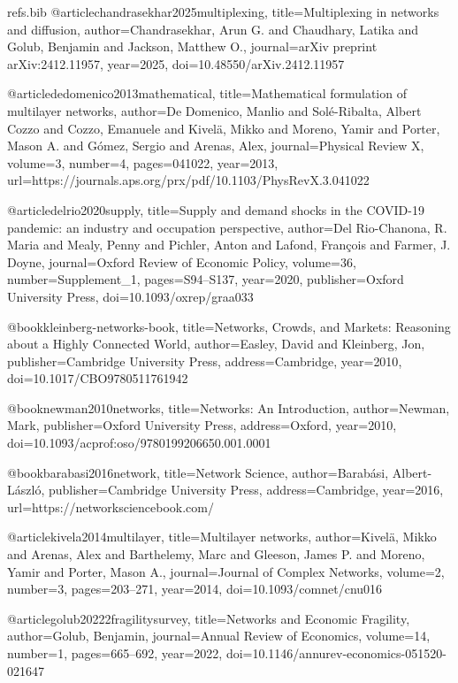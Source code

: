 \begin{filecontents}[overwrite]{refs.bib}
@article{chandrasekhar2025multiplexing,
  title={Multiplexing in networks and diffusion},
  author={Chandrasekhar, Arun G. and Chaudhary, Latika and Golub, Benjamin and Jackson, Matthew O.},
  journal={arXiv preprint arXiv:2412.11957},
  year={2025},
  doi={10.48550/arXiv.2412.11957}
}

@article{dedomenico2013mathematical,
  title={Mathematical formulation of multilayer networks},
  author={De Domenico, Manlio and Sol{\'e}-Ribalta, Albert Cozzo and Cozzo, Emanuele and Kivel{\"a}, Mikko and Moreno, Yamir and Porter, Mason A. and G{\'o}mez, Sergio and Arenas, Alex},
  journal={Physical Review X},
  volume={3},
  number={4},
  pages={041022},
  year={2013},
  url={https://journals.aps.org/prx/pdf/10.1103/PhysRevX.3.041022}
}

@article{delrio2020supply,
  title={Supply and demand shocks in the COVID-19 pandemic: an industry and occupation perspective},
  author={Del Rio-Chanona, R. Maria and Mealy, Penny and Pichler, Anton and Lafond, Fran{\c{c}}ois and Farmer, J. Doyne},
  journal={Oxford Review of Economic Policy},
  volume={36},
  number={Supplement\_1},
  pages={S94--S137},
  year={2020},
  publisher={Oxford University Press},
  doi={10.1093/oxrep/graa033}
}


@book{kleinberg-networks-book,
  title={Networks, Crowds, and Markets: Reasoning about a Highly Connected World},
  author={Easley, David and Kleinberg, Jon},
  publisher={Cambridge University Press},
  address={Cambridge},
  year={2010},
  doi={10.1017/CBO9780511761942}
}

@book{newman2010networks,
  title={Networks: An Introduction},
  author={Newman, Mark},
  publisher={Oxford University Press},
  address={Oxford},
  year={2010},
  doi={10.1093/acprof:oso/9780199206650.001.0001}
}

@book{barabasi2016network,
  title={Network Science},
  author={Barab{\'a}si, Albert-L{\'a}szl{\'o}},
  publisher={Cambridge University Press},
  address={Cambridge},
  year={2016},
  url={https://networksciencebook.com/}
}

@article{kivela2014multilayer,
  title={Multilayer networks},
  author={Kivel{\"a}, Mikko and Arenas, Alex and Barthelemy, Marc and Gleeson, James P. and Moreno, Yamir and Porter, Mason A.},
  journal={Journal of Complex Networks},
  volume={2},
  number={3},
  pages={203--271},
  year={2014},
  doi={10.1093/comnet/cnu016}
}

@article{golub20222fragilitysurvey,
  title={Networks and Economic Fragility},
  author={Golub, Benjamin},
  journal={Annual Review of Economics},
  volume={14},
  number={1},
  pages={665--692},
  year={2022},
  doi={10.1146/annurev-economics-051520-021647}
}


\end{filecontents}
